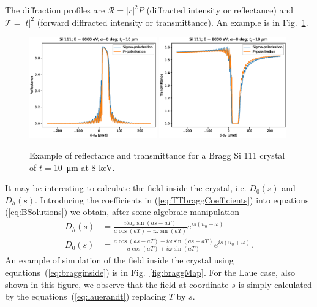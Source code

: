 \documentclass[preprint]{iucr}              %
\newcommand{\inblue}[1]{{\color{blue}#1}}
\newcommand{\inred}[1]{{\color{red}#1}}
\begin{document}
The diffraction profiles are $\mathcal{R}=|r|^2 P$ (diffracted intensity or reflectance) and $\mathcal{T}=|t|^2$ (forward diffracted intensity or transmittance).
An example is in Fig.~\ref{fig:braggProfiles}. 

\begin{figure}\label{fig:braggProfiles}
    \centering
    \includegraphics[width=0.49\textwidth]{figures/Bragg_1.eps}
    \includegraphics[width=0.49\textwidth]{figures/Bragg_2.eps}
    \caption{Example of reflectance and transmittance for a Bragg Si 111 crystal of $t=$\SI{10}{\micro\meter} at 8 keV. }
\end{figure}

\inred{
It may be interesting to calculate the field inside the crystal, i.e. $D_0(s)$ and $D_h(s)$. Introducing the coefficients in (\ref{eq:TTbraggCoefficients}) into equations (\ref{eq:BSolutions}) we obtain, after some algebraic manipulation
\begin{subequations}\label{eq:bragginside}
\begin{align}
D_h(s)&=\frac{i b u_h \sin(as - aT)}{a \cos(aT) + i \omega \sin(aT)} e^{is(u_0+\omega)}\\
D_0(s)&= \frac{a \cos(as-aT) - i \omega \sin(as-aT)}{a \cos(aT) + i \omega \sin(aT)} e^{is(u_0+\omega)}.
\end{align}
\end{subequations}
}
\inblue{
An example of simulation of the field inside the crystal using equations~(\ref{eq:bragginside}) is in Fig.~\ref{fig:braggMap}. For the Laue case, also shown in this figure, we observe that the field at coordinate $s$ is simply calculated by the equations~(\ref{eq:lauerandt}) replacing $T$ by $s$. 
}
\end{document}
